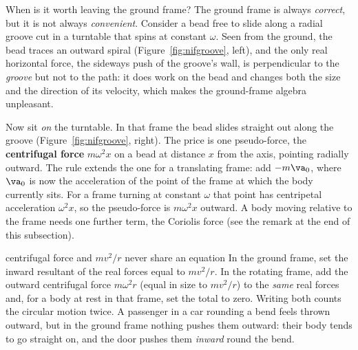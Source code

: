 \begin{motivbox}{When is it worth leaving the ground frame?}
The ground frame is always \emph{correct}, but it is not always \emph{convenient}. Consider a bead free
to slide along a radial groove cut in a turntable that spins at constant $\omega$. Seen from the
ground, the bead traces an outward spiral (Figure~\ref{fig:nifgroove}, left), and the only real horizontal force, the sideways push of
the groove's wall, is perpendicular to the \emph{groove} but not to the path: it does work on the bead
and changes both the size and the direction of its velocity, which makes the ground-frame algebra
unpleasant.

Now sit \emph{on} the turntable. In that frame the bead slides straight out along the groove
(Figure~\ref{fig:nifgroove}, right).
The price is one pseudo-force, the \textbf{centrifugal force} $m\omega^{2}x$ on a bead at distance $x$
from the axis, pointing radially outward. The rule extends the one for a translating frame: add $-m\va_0$,
where $\va_0$ is now the acceleration of the point of the frame at which the body currently sits. For a frame
turning at constant $\omega$ that point has centripetal acceleration $\omega^{2}x$, so the pseudo-force
is $m\omega^{2}x$ outward. A body moving relative to the frame needs one further term, the Coriolis
force (see the remark at the end of this subsection).
\end{motivbox}

\begin{trapbox}{centrifugal force and $mv^2/r$ never share an equation}
In the ground frame, set the inward resultant of the real forces equal to $mv^2/r$. In the rotating
frame, add the outward centrifugal force $m\omega^2r$ (equal in size to $mv^2/r$) to the \emph{same} real
forces and, for a body at rest in that frame, set the total to zero. Writing both counts the circular motion twice. A passenger in a car
rounding a bend feels thrown outward, but in the ground frame nothing pushes them outward: their body
tends to go straight on, and the door pushes them \emph{inward} round the bend.
\end{trapbox}

\begin{figure}[htbp]
\centering
{}
\end{figure}

